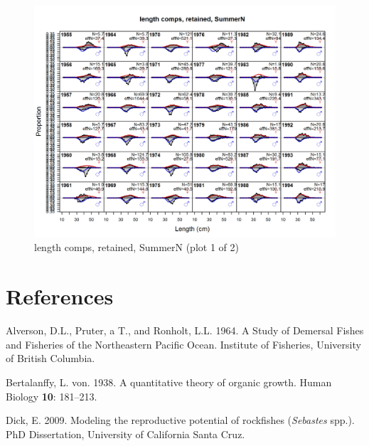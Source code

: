 \documentclass[12pt,]{article}
\begin{document}
\begin{figure}[htbp]
\centering
\includegraphics{./r4ss/plots_mod1/comp_lenfit_flt2mkt2_page1.png}
\caption{length comps, retained, SummerN (plot 1 of 2)
\label{fig:mod1_10_comp_lenfit_flt2mkt2_page1}}
\end{figure}

\FloatBarrier

\FloatBarrier

\FloatBarrier

\FloatBarrier

\FloatBarrier

\FloatBarrier

\FloatBarrier

\newpage

\section*{References}\label{references}

\renewcommand{\thepage}{}

\hypertarget{refs}{}
\hypertarget{ref-Alverson1964}{}
Alverson, D.L., Pruter, a T., and Ronholt, L.L. 1964. A Study of
Demersal Fishes and Fisheries of the Northeastern Pacific Ocean.
Institute of Fisheries, University of British Columbia.

\hypertarget{ref-vonB1938}{}
Bertalanffy, L. von. 1938. A quantitative theory of organic growth.
Human Biology \textbf{10}: 181--213.

\hypertarget{ref-Dick2009}{}
Dick, E. 2009. Modeling the reproductive potential of rockfishes
(\emph{Sebastes} spp.). PhD Dissertation, University of California Santa
Cruz.
\end{document}
